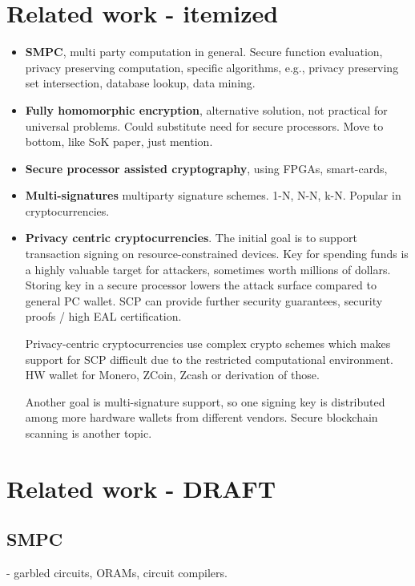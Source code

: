 \documentclass[
  digital, %
  twoside, %
  table,   %
  lof,     %
  lot,     %
]{fithesis3}
\begin{document}
\begin{ecmmnt}  %
\section{Related work - itemized}
\begin{itemize}
    \item {\bf{SMPC}}, multi party computation in general. Secure function evaluation, privacy preserving computation, specific algorithms, e.g., privacy preserving set intersection, database lookup, data mining. 
    
    \item {\bf{Fully homomorphic encryption}}, alternative solution, not practical for universal problems. Could substitute need for secure processors. Move to bottom, like SoK paper, just mention.
    
    \item {\bf{Secure processor assisted cryptography}}, using FPGAs, smart-cards, 
    
    \item {\bf{Multi-signatures}} multiparty signature schemes. 1-N, N-N, k-N. Popular in cryptocurrencies.
    
    \item {\bf{Privacy centric cryptocurrencies}}. The initial goal is to support transaction signing on resource-constrained devices. Key for spending funds is a highly valuable target for attackers, sometimes worth millions of dollars. Storing key in a secure processor lowers the attack surface compared to general PC wallet. SCP can provide further security guarantees, security proofs / high EAL certification. 
    
    Privacy-centric cryptocurrencies use complex crypto schemes which makes support for SCP difficult due to the restricted computational environment. HW wallet for Monero, ZCoin, Zcash or derivation of those. 
    
    Another goal is multi-signature support, so one signing key is distributed among more hardware wallets from different vendors. Secure blockchain scanning is another topic. 
\end{itemize}

\section{Related work - DRAFT}
    \subsection{SMPC}
    - garbled circuits, ORAMs, circuit compilers.
    

\end{ecmmnt}
\end{document}
